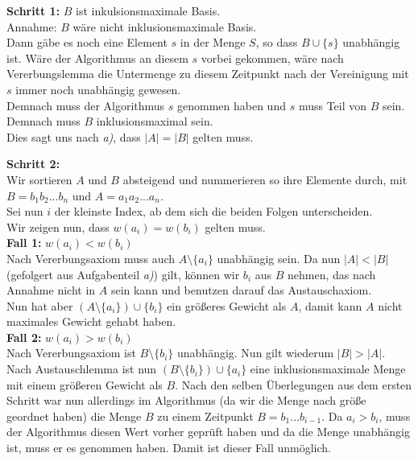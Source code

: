 \documentclass[11pt,a4paper,ngerman]{article}
\begin{document}
\begin{enumerate}[\bfseries (a)]
\textbf{Schritt 1:} $B$ ist inkulsionsmaximale Basis.\\
Annahme: $B$ wäre nicht inklusionsmaximale Basis.\\
Dann gäbe es noch eine Element $s$  in der Menge $S$, so dass $B \cup \{ s \}$ unabhängig ist. Wäre der Algorithmus an diesem $s$ vorbei gekommen, wäre nach Vererbungslemma die Untermenge zu diesem Zeitpunkt nach der Vereinigung mit $s$ immer noch unabhängig gewesen.\\

Demnach muss der Algorithmus $s$ genommen haben und $s$ muss Teil von $B$ sein. Demnach muss $B$ inklusionsmaximal sein.\\
Dies sagt uns nach \emph{a)}, dass $|A| = |B|$ gelten muss.

\textbf{Schritt 2:}\\
Wir sortieren $A$ und $B$ absteigend und nummerieren so ihre Elemente durch, mit $B = b_1b_2 ... b_n$ und $A = a_1a_2 ... a_n$.\\
Sei nun $i$ der kleinste Index, ab dem sich die beiden Folgen unterscheiden.\\

Wir zeigen nun, dass $w(a_i) = w(b_i)$ gelten muss.\\

\textbf{Fall 1:} $w(a_i) < w(b_i)$\\
Nach Vererbungsaxiom muss auch $A \setminus \{ a_i \}$ unabhängig sein. Da nun $|A| < |B|$ (gefolgert aus Aufgabenteil \emph{a)}) gilt, können wir $b_i$ aus $B$ nehmen, das nach Annahme nicht in $A$ sein kann und benutzen darauf das Austauschaxiom.\\
Nun hat aber $(A \setminus \{a_i \}) \cup \{ b_i \}$ ein größeres Gewicht als $A$, damit kann $A$ nicht maximales Gewicht gehabt haben.\\

\textbf{Fall 2:} $w(a_i) > w(b_i)$\\
Nach Vererbungsaxiom ist $B \setminus \{ b_i \}$ unabhängig. Nun gilt wiederum $|B| > |A|$. Nach Austauschlemma ist nun $(B \setminus \{ b_i \} ) \cup \{ a_i \}$ eine inklusionsmaximale Menge mit einem größeren Gewicht als $B$. Nach den selben Überlegungen aus dem ersten Schritt war nun allerdings im Algorithmus (da wir die Menge nach größe geordnet haben) die Menge $B$ zu einem Zeitpunkt $B = b_1 ... b_{i-1}$. Da $a_{i} > b_{i}$, muss der Algorithmus diesen Wert vorher geprüft haben und da die Menge unabhängig ist, muss er es genommen haben. Damit ist dieser Fall unmöglich.\\


\end{enumerate}
\end{document}
